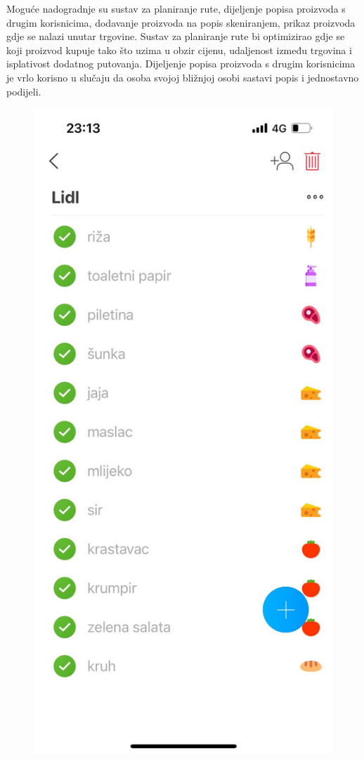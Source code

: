 		Moguće nadogradnje su sustav za planiranje rute, dijeljenje popisa proizvoda s drugim korisnicima, dodavanje proizvoda na popis skeniranjem, prikaz proizvoda gdje se nalazi unutar trgovine. Sustav za planiranje rute bi optimizirao gdje se koji proizvod kupuje tako što uzima u obzir cijenu, udaljenost između trgovina i isplativost dodatnog putovanja. Dijeljenje popisa proizvoda s drugim korisnicima je vrlo korisno u slučaju da osoba svojoj bližnjoj osobi sastavi popis i jednostavno podijeli.\\
		
		\begin{figure}[h]
			\begin{minipage}[t]{0.4\linewidth}
			\includegraphics[width = \linewidth]{slike/listonic_primjer.JPEG}

\end{minipage}
\end{figure}
